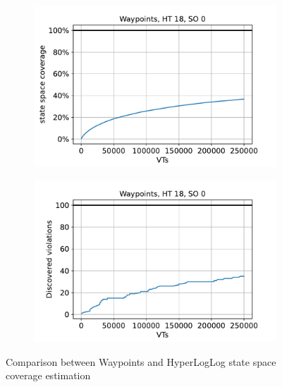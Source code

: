\documentclass[
fancyheadings, %
%
%
]{stsreprt}
\begin{document}
\begin{figure}[!b]
    \begin{subfigure}[b]{.5\textwidth}
        \centering
        \includegraphics[width=\textwidth]{../evaluation/output-assets/EXP-01-comparison-waypoints-hll-1.pdf}
        \label{fig:evaluation:EXP-01:1}
    \end{subfigure}
    \begin{subfigure}[b]{.5\textwidth}
        \centering
        \includegraphics[width=\textwidth]{../evaluation/output-assets/EXP-01-comparison-waypoints-hll-2.pdf}
        \label{fig:evaluation:EXP-01:2}
    \end{subfigure}
    \caption{Comparison between Waypoints and HyperLogLog state space coverage estimation}
    \label{fig:evaluation:EXP-01}
\end{figure}
\end{document}
